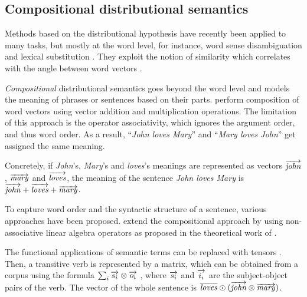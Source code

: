 \subsection{Compositional distributional semantics}
\label{sec:composition}

Methods based on the distributional hypothesis have recently been applied to many tasks, but mostly at the word level, for instance, word sense disambiguation \cite{ZhitomirskyGeffet2009} and lexical substitution \cite{Thater:2010:CSR:1858681.1858778}. They exploit the notion of similarity which correlates with the angle between word vectors \cite{Turney:2010:FMV:1861751.1861756}.

\emph{Compositional} distributional semantics goes beyond the word level and models the meaning of phrases or sentences based on their parts.  perform composition of word vectors using vector addition and multiplication operations. The limitation of this approach is the operator associativity, which ignores the argument order, and thus word order. As a result, ``\textit{John loves Mary}'' and ``\textit{Mary loves John}'' get assigned the same meaning.

Concretely, if \textit{John}'s, \textit{Mary}'s and \textit{loves}'s meanings are
represented as vectors $\overrightarrow{\mathit{john}}$, $\overrightarrow{\mathit{mary}}$ and
$\overrightarrow{\mathit{loves}}$, the meaning of the sentence \textit{John loves Mary} is
$\overrightarrow{\mathit{john}} + \overrightarrow{\mathit{loves}} + \overrightarrow{\mathit{mary}}$.

To capture word order and the syntactic structure of a sentence, various approaches have been proposed.  extend the compositional approach by using non-associative linear algebra operators as proposed in the theoretical work of .

The functional applications of semantic terms can be replaced with tensors \cite{Bourbaki1998commutative}. Then, a transitive verb is represented by a matrix, which can be obtained from a corpus using the formula $\sum_i\overrightarrow{s_i} \otimes \overrightarrow{o_i}$ \cite{Grefenstette:2011:ESC:2145432.2145580}, where $\overrightarrow{s_i}$ and $\overrightarrow{i_i}$ are the subject-object pairs of the verb. The vector of the whole sentence is $\overline{\mathit{loves}} \odot(\overrightarrow{\mathit{john}} \otimes \overrightarrow{\mathit{mary}})$.
%
%
%

